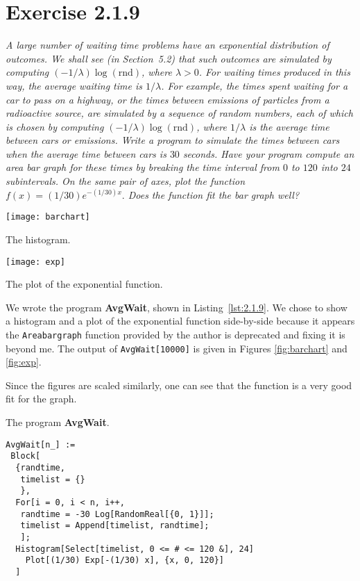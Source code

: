 \documentclass{tufte-handout}
\newenvironment{listingenv} {
  \begin{mylisting}
} {
  \end{mylisting}
}
\begin{document}
\section{Exercise 2.1.9}

\textit{A large number of waiting time problems have an exponential
  distribution of outcomes. We shall see (in Section~5.2) that such
  outcomes are simulated by computing
  $(-1/\lambda)\log{(\mathrm{rnd})}$, where $\lambda > 0$. For waiting
  times produced in this way, the average waiting time is
  $1/\lambda$. For example, the times spent waiting for a car to pass
  on a highway, or the times between emissions of particles from a
  radioactive source, are simulated by a sequence of random numbers,
  each of which is chosen by computing
  $(-1/\lambda)\log{(\mathrm{rnd})}$, where $1/\lambda$ is the average
  time between cars or emissions. Write a program to simulate the
  times between cars when the average time between cars is $30$
  seconds. Have your program compute an area bar graph for these times
  by breaking the time interval from $0$ to $120$ into $24$
  subintervals. On the same pair of axes, plot the function
  $f(x) = (1/30)e^{-(1/30)x}.$ Does the function fit the bar graph
  well?}

\bigskip

\begin{marginfigure}
  \centering
  \texttt{[image: barchart]}
  \caption{The histogram.}
  \label{fig:barchart}
\end{marginfigure}

\begin{marginfigure}[4cm]
  \texttt{[image: exp]}
  \caption{The plot of the exponential function.}
  \label{fig:exp}
\end{marginfigure}

We wrote the program \textbf{AvgWait}, shown in
Listing~\ref{lst:2.1.9}.  We chose to show a histogram and a plot of
the exponential function side-by-side because it appears the
\lstinline$Areabargraph$ function provided by the author is deprecated
and fixing it is beyond me. The output of \lstinline$AvgWait[10000]$
is given in Figures \ref{fig:barchart} and \ref{fig:exp}.

Since the figures are scaled similarly, one can see that the function
is a very good fit for the graph.

\begin{listingenv}
\caption{The program \mbox{\textbf{AvgWait}}.}
\label{lst:2.1.9}
\begin{lstlisting}
AvgWait[n_] :=
 Block[
  {randtime,
   timelist = {}
   },
  For[i = 0, i < n, i++,
   randtime = -30 Log[RandomReal[{0, 1}]];
   timelist = Append[timelist, randtime];
   ];
  Histogram[Select[timelist, 0 <= # <= 120 &], 24]
    Plot[(1/30) Exp[-(1/30) x], {x, 0, 120}]
  ]
\end{lstlisting}
\end{listingenv}
\end{document}
